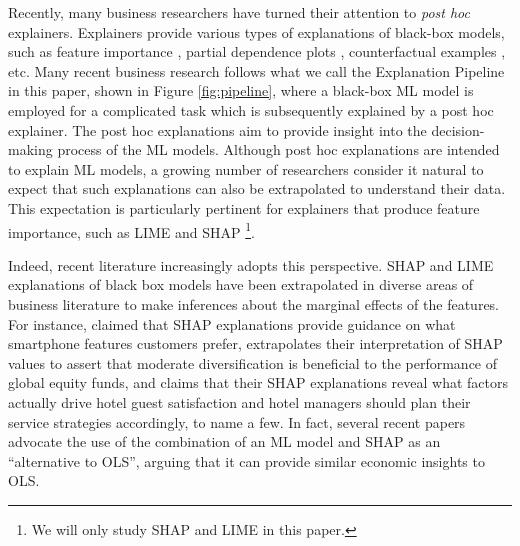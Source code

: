 \documentclass[mnsc,blindrev]{informs3}
\begin{document}
Recently, many business researchers have turned their attention to \emph{post hoc} explainers. Explainers provide various types of explanations of black-box models, such as feature importance \citep{ribeiro16lime,lundberg17shap}, partial dependence plots \citep{friedman01pdp}, counterfactual examples \citep{mothilal20dice}, etc. Many recent business research follows what we call the Explanation Pipeline in this paper, shown in Figure \ref{fig:pipeline}, where a black-box ML model is employed for a complicated task which is subsequently explained by a post hoc explainer. %
The post hoc explanations aim to provide insight into the decision-making process of the ML models. 
Although post hoc explanations are intended to explain ML models, a growing number of researchers consider it natural to expect that such explanations can also be extrapolated to understand their data. This expectation is particularly pertinent for explainers that produce feature importance, such as LIME \citep{ribeiro16lime} and SHAP \citep{lundberg17shap}\footnote{We will only study SHAP and LIME in this paper.}.


Indeed, recent literature increasingly adopts this perspective. SHAP and LIME explanations of black box models have been extrapolated in diverse areas of business literature to make inferences about the marginal effects of the features. For instance, \cite{park2024extracting} claimed that SHAP explanations provide guidance on what smartphone features customers prefer, \cite{kovvuri23fund}  extrapolates their interpretation of SHAP values to assert that moderate diversification is beneficial to the performance of global equity funds, and \cite{sanchez2023role} claims that their SHAP explanations reveal what factors actually drive hotel guest satisfaction and hotel managers should plan their service strategies accordingly, to name a few. In fact, several recent papers \citep{berger2023supply,srivastava23energy,zhou23consumption,hanauer22boosting} advocate the use of the combination of an ML model and SHAP as an  ``alternative to OLS'', arguing that it can provide similar economic insights to OLS. %
\end{document}
